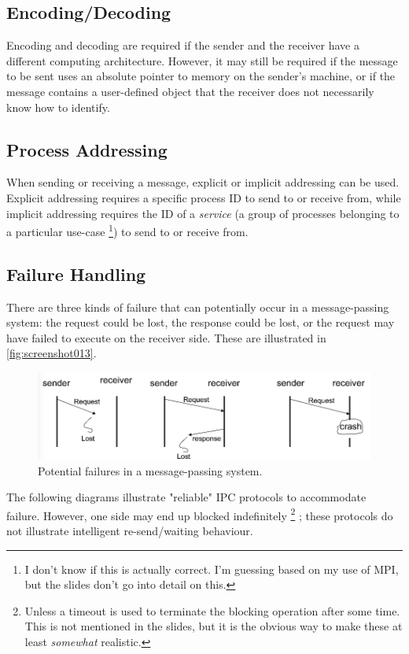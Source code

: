 \subsection{Encoding/Decoding}
Encoding and decoding are required if the sender and the receiver have a different computing architecture. However, it may still be required if the message to be sent uses an absolute pointer to memory on the sender's machine, or if the message contains a user-defined object that the receiver does not necessarily know how to identify.

\subsection{Process Addressing}
When sending or receiving a message, explicit or implicit addressing can be used. Explicit addressing requires a specific process ID to send to or receive from, while implicit addressing requires the ID of a \textit{service} (a group of processes belonging to a particular use-case \footnote{I don't know if this is actually correct. I'm guessing based on my use of MPI, but the slides don't go into detail on this.}) to send to or receive from.

\subsection{Failure Handling}
There are three kinds of failure that can potentially occur in a message-passing system: the request could be lost, the response could be lost, or the request may have failed to execute on the receiver side. These are illustrated in \autoref{fig:screenshot013}.

\begin{figure}[h]
\centering
\includegraphics[width=0.6\linewidth]{figures/screenshot013}
\caption{Potential failures in a message-passing system.}
\label{fig:screenshot013}
\end{figure}

The following diagrams illustrate "reliable" IPC protocols to accommodate failure. However, one side may end up blocked indefinitely \footnote{Unless a timeout is used to terminate the blocking operation after some time. This is not mentioned in the slides, but it is the obvious way to make these at least \textit{somewhat} realistic.} ; these protocols do not illustrate intelligent re-send/waiting behaviour.

